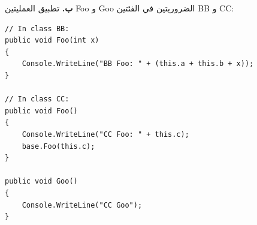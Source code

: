 \begin{boxSolution}
\textbf{ب.} تطبيق العمليتين \textenglish{Foo} و \textenglish{Goo} الضروريتين في الفئتين \textenglish{BB} و \textenglish{CC}:
\begin{boxCode}
\begin{english}
\begin{verbatim}
// In class BB:
public void Foo(int x)
{
    Console.WriteLine("BB Foo: " + (this.a + this.b + x));
}

// In class CC:
public void Foo()
{
    Console.WriteLine("CC Foo: " + this.c);
    base.Foo(this.c);
}

public void Goo()
{
    Console.WriteLine("CC Goo");
}
\end{verbatim}
\end{english}
\end{boxCode}
\end{boxSolution}
\fi
\filbreak
